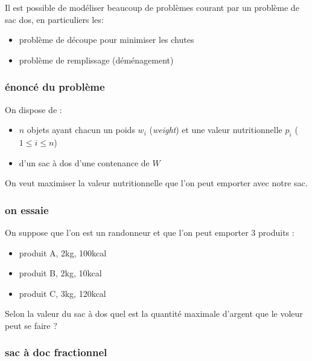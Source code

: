 \documentclass[
]{article}
\providecommand{\tightlist}{%
  \setlength{\itemsep}{0pt}\setlength{\parskip}{0pt}}
\begin{document}
Il est possible de modéliser beaucoup de problèmes courant par un
problème de sac dos, en particuliers les:

\begin{itemize}
\tightlist
\item
  problème de découpe pour minimiser les chutes
\item
  problème de remplissage (déménagement)
\end{itemize}

\hypertarget{uxe9noncuxe9-du-probluxe8me}{%
\subsubsection{énoncé du problème}\label{uxe9noncuxe9-du-probluxe8me}}

On dispose de :

\begin{itemize}
\tightlist
\item
  \(n\) objets ayant chacun un poids \(w_i\) (\emph{weight}) et une
  valeur nutritionnelle \(p_i\) (\(1 \leq i \leq n\))
\item
  d'un sac à dos d'une contenance de \(W\)
\end{itemize}

On veut maximiser la valeur nutritionnelle que l'on peut emporter avec
notre sac.

\hypertarget{on-essaie}{%
\subsubsection{on essaie}\label{on-essaie}}

On suppose que l'on est un randonneur et que l'on peut emporter 3
produits :

\begin{itemize}
\tightlist
\item
  produit A, 2kg, 100kcal
\item
  produit B, 2kg, 10kcal
\item
  produit C, 3kg, 120kcal
\end{itemize}

Selon la valeur du sac à dos quel est la quantité maximale d'argent que
le voleur peut se faire ?

\hypertarget{sac-uxe0-doc-fractionnel}{%
\subsubsection{sac à doc fractionnel}\label{sac-uxe0-doc-fractionnel}}
\end{document}
